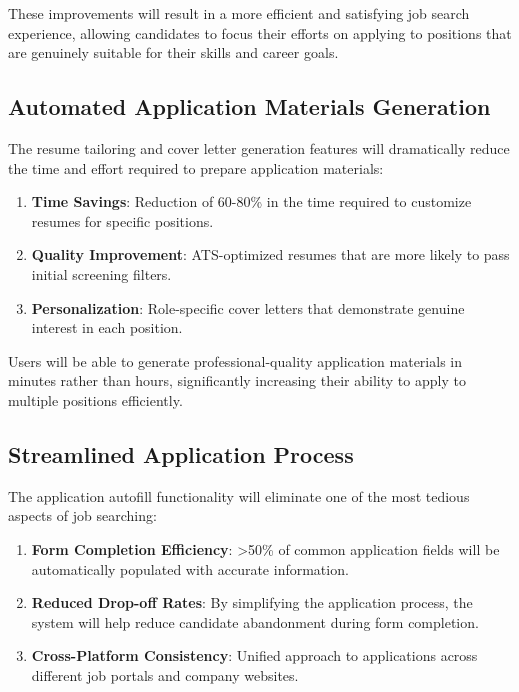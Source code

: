 \documentclass[12pt,a4paper]{report}
\begin{document}
These improvements will result in a more efficient and satisfying job search experience, allowing candidates to focus their efforts on applying to positions that are genuinely suitable for their skills and career goals.

\subsection*{Automated Application Materials Generation}

The resume tailoring and cover letter generation features will dramatically reduce the time and effort required to prepare application materials:

\begin{enumerate}
    \item \textbf{Time Savings}: Reduction of 60-80\% in the time required to customize resumes for specific positions.
    \item \textbf{Quality Improvement}: ATS-optimized resumes that are more likely to pass initial screening filters.
    \item \textbf{Personalization}: Role-specific cover letters that demonstrate genuine interest in each position.
\end{enumerate}

Users will be able to generate professional-quality application materials in minutes rather than hours, significantly increasing their ability to apply to multiple positions efficiently.

\subsection*{Streamlined Application Process}

The application autofill functionality will eliminate one of the most tedious aspects of job searching:

\begin{enumerate}
    \item \textbf{Form Completion Efficiency}: >50\% of common application fields will be automatically populated with accurate information.
    \item \textbf{Reduced Drop-off Rates}: By simplifying the application process, the system will help reduce candidate abandonment during form completion.
    \item \textbf{Cross-Platform Consistency}: Unified approach to applications across different job portals and company websites.
\end{enumerate}
\end{document}
